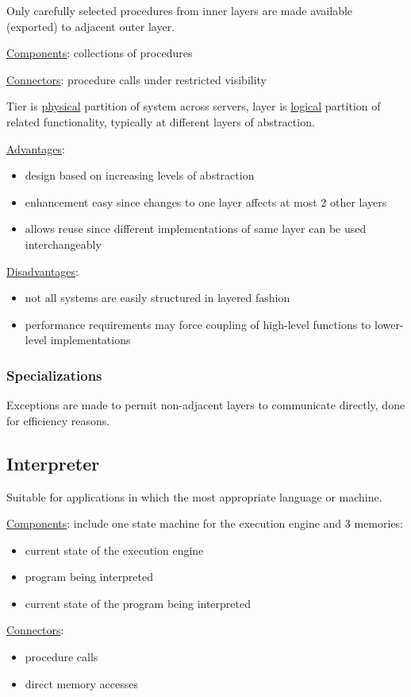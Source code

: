 \documentclass[11pt]{article}
\begin{document}
Only carefully selected procedures from inner layers are made available (exported) to adjacent
outer layer.

\uline{Components}: collections of procedures

\uline{Connectors}: procedure calls under restricted visibility

Tier is \uline{physical} partition of system across servers, layer is \uline{logical} partition of related
functionality, typically at different layers of abstraction.

\uline{Advantages}:
\begin{itemize}
\item design based on increasing levels of abstraction
\item enhancement easy since changes to one layer affects at most 2 other layers
\item allows reuse since different implementations of same layer can be used interchangeably
\end{itemize}

\uline{Disadvantages}:
\begin{itemize}
\item not all systems are easily structured in layered fashion
\item performance requirements may force coupling of high-level functions to lower-level implementations
\end{itemize}
\subsubsection{Specializations}
\label{sec:org38d91ea}
Exceptions are made to permit non-adjacent layers to communicate directly, done for
efficiency reasons.
\subsection{Interpreter}
\label{sec:orgabcf2d0}
Suitable for applications in which the most appropriate language or machine.

\uline{Components}: include one state machine for the execution engine and 3 memories:
\begin{itemize}
\item current state of the execution engine
\item program being interpreted
\item current state of the program being interpreted
\end{itemize}

\uline{Connectors}:
\begin{itemize}
\item procedure calls
\item direct memory accesses
\end{itemize}
\end{document}
